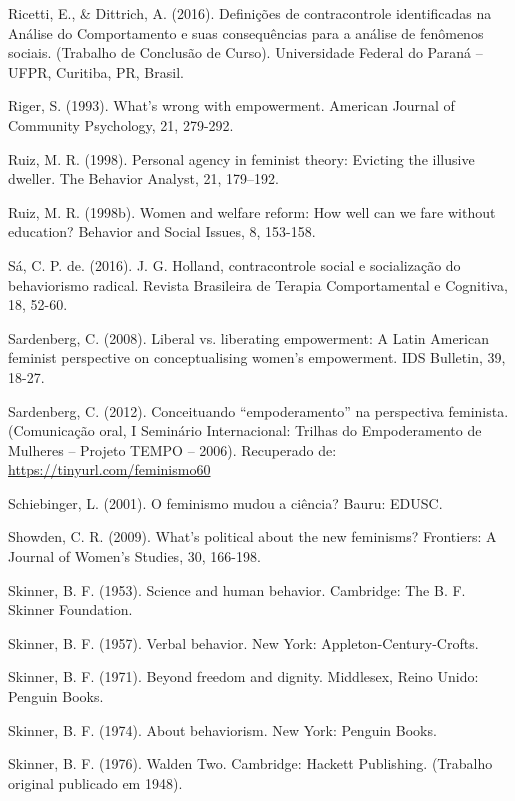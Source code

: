 \hangindent=25pt
\noindent Ricetti, E., \& Dittrich, A. (2016). Definições de contracontrole identificadas na Análise do Comportamento e suas consequências para a análise de fenômenos sociais. (Trabalho de Conclusão de Curso). Universidade Federal do Paraná – UFPR, Curitiba, PR, Brasil.

\hangindent=25pt
\noindent Riger, S. (1993). What’s wrong with empowerment. American Journal of Community Psychology, 21, 279-292.

\hangindent=25pt
\noindent Ruiz, M. R. (1998). Personal agency in feminist theory: Evicting the illusive dweller. The Behavior Analyst, 21, 179–192.

\hangindent=25pt
\noindent Ruiz, M. R. (1998b). Women and welfare reform: How well can we fare without education? Behavior and Social Issues, 8, 153-158.

\hangindent=25pt
\noindent Sá, C. P. de. (2016). J. G. Holland, contracontrole social e socialização do behaviorismo radical. Revista Brasileira de Terapia Comportamental e Cognitiva, 18, 52-60.

\hangindent=25pt
\noindent Sardenberg, C. (2008). Liberal vs. liberating empowerment: A Latin American 	feminist perspective on conceptualising women's empowerment. IDS Bulletin, 39, 18-27.

\hangindent=25pt
\noindent Sardenberg, C. (2012). Conceituando “empoderamento” na perspectiva feminista. (Comunicação oral, I Seminário Internacional: Trilhas do Empoderamento de Mulheres – Projeto TEMPO – 2006). Recuperado de: \url{https://tinyurl.com/feminismo60}

\hangindent=25pt
\noindent Schiebinger, L. (2001). O feminismo mudou a ciência? Bauru: EDUSC.

\hangindent=25pt
\noindent Showden, C. R. (2009). What’s political about the new feminisms? Frontiers: A Journal of Women’s Studies, 30, 166-198.

\hangindent=25pt
\noindent Skinner, B. F. (1953). Science and human behavior. Cambridge: The B. F. Skinner Foundation.

\hangindent=25pt
\noindent Skinner, B. F. (1957). Verbal behavior. New York: Appleton-Century-Crofts.

\hangindent=25pt
\noindent Skinner, B. F. (1971). Beyond freedom and dignity. Middlesex, Reino Unido: Penguin Books. 

\hangindent=25pt
\noindent Skinner, B. F. (1974). About behaviorism. New York: Penguin Books.

\hangindent=25pt
\noindent Skinner, B. F. (1976). Walden Two. Cambridge: Hackett Publishing. (Trabalho original publicado em 1948).
